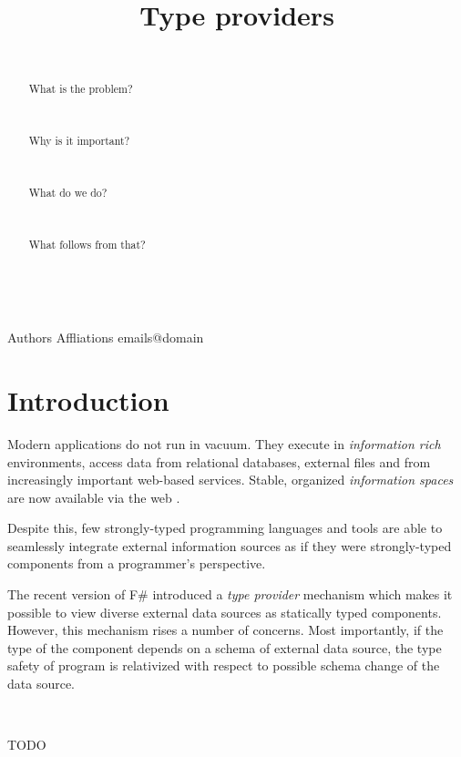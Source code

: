 \documentclass[10pt]{sigplanconf}
\begin{document}
\title{Type providers}

\authorinfo
  {Authors}
  {Affliations}
  {emails@domain}

\maketitle

\begin{abstract}
~
 
What is the problem?

~

Why is it important?

~

What do we do?

~

What follows from that?

~
\end{abstract}

\section{Introduction}
Modern applications do not run in vacuum. They execute in \emph{information rich} environments,
access data from relational databases, external files and from increasingly important web-based 
services. Stable, organized \emph{information spaces} are now available via the web \cite{providers-techreport}.

Despite this, few strongly-typed programming languages and tools are able to seamlessly integrate 
external information sources as if they were strongly-typed components from a programmer's 
perspective. 

The recent version of F\# introduced a \emph{type provider} mechanism \cite{providers-techreport} 
which makes it possible to view diverse external data sources as statically typed components. However,
this mechanism rises a number of concerns. Most importantly, if the type of the component depends on
a schema of external data source, the type safety of program is relativized with respect to possible
schema change of the data source.

~

TODO

\newpage
\end{document}
